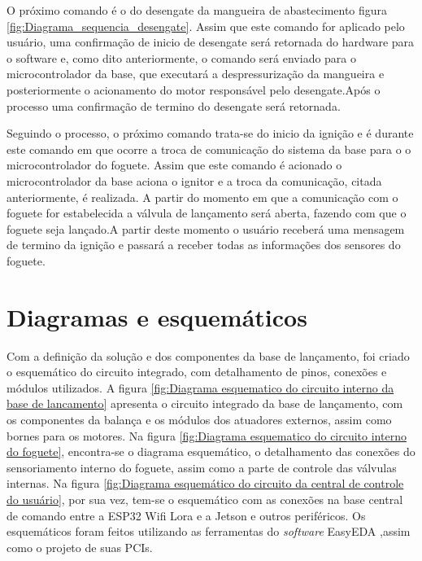 O próximo comando é o do desengate da mangueira de abastecimento figura \ref{fig:Diagrama_sequencia_desengate}. Assim que este comando for aplicado pelo usuário, uma confirmação de inicio de desengate será retornada do hardware para o software e, como dito anteriormente, o comando será enviado para o microcontrolador da base, que executará  a despressurização da mangueira e posteriormente o acionamento do motor responsável pelo  desengate.Após o processo uma confirmação de termino do desengate será retornada.

Seguindo o processo, o próximo comando trata-se do inicio da ignição e é durante este comando em que ocorre a troca de comunicação do sistema da base para o o microcontrolador do foguete. Assim que este comando é acionado o microcontrolador da base aciona o ignitor e a troca da comunicação, citada anteriormente, é realizada. A partir do momento em que a comunicação com o foguete for estabelecida a válvula de lançamento será aberta, fazendo com que o foguete seja lançado.A partir deste momento o usuário receberá uma mensagem de termino da ignição e passará a receber todas as informações dos sensores do foguete.  







\section{Diagramas e esquemáticos}

\par Com a definição da solução e dos componentes da base de lançamento, foi criado o esquemático do circuito integrado, com detalhamento de pinos, conexões e módulos utilizados. A figura \ref{fig:Diagrama esquematico do circuito interno da base de lancamento} apresenta o circuito integrado da base de lançamento, com os componentes da balança e os módulos dos atuadores externos, assim como bornes para os motores. Na figura \ref{fig:Diagrama esquematico do circuito interno do foguete}, encontra-se o diagrama esquemático, o detalhamento das conexões do sensoriamento interno do foguete, assim como a parte de controle das válvulas internas. Na figura \ref{fig:Diagrama esquemático do circuito da central de controle do usuário}, por sua vez, tem-se o esquemático com as conexões na base central de comando entre a ESP32 Wifi Lora e a Jetson e outros periféricos. Os esquemáticos foram feitos utilizando as ferramentas do \textit{software} EasyEDA ,assim como o projeto de suas PCIs.

